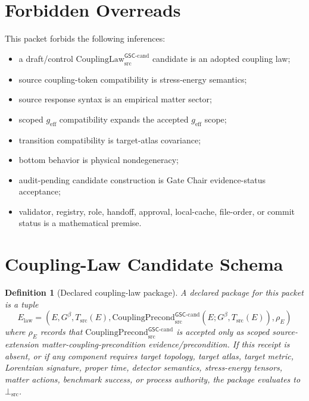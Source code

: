 \documentclass[11pt]{article}
\newcommand{\Gbeta}{G^\beta}
\newcommand{\geff}{g_{\mathrm{eff}}}
\newcommand{\CouplingPrecond}{\mathrm{CouplingPrecond}^{\mathsf{GSC}\mbox{-}\mathrm{cand}}_{\mathrm{src}}}
\newcommand{\CouplingLaw}{\mathrm{CouplingLaw}^{\mathsf{GSC}\mbox{-}\mathrm{cand}}_{\mathrm{src}}}
\newcommand{\BottomSrc}{\bot_{\mathrm{src}}}
\newtheorem{definition}{Definition}
\begin{document}
\section{Forbidden Overreads}

This packet forbids the following inferences:

\begin{itemize}[leftmargin=*]
  \item a draft/control \(\CouplingLaw\) candidate is an adopted coupling law;
  \item source coupling-token compatibility is stress-energy semantics;
  \item source response syntax is an empirical matter sector;
  \item scoped \(\geff\) compatibility expands the accepted \(\geff\) scope;
  \item transition compatibility is target-atlas covariance;
  \item bottom behavior is physical nondegeneracy;
  \item audit-pending candidate construction is Gate Chair evidence-status
  acceptance;
  \item validator, registry, role, handoff, approval, local-cache, file-order,
  or commit status is a mathematical premise.
\end{itemize}

\section{Coupling-Law Candidate Schema}

\begin{definition}[Declared coupling-law package]
A declared package for this packet is a tuple
\[
  E_{\mathrm{law}} =
  (E,\Gbeta,T_{\mathrm{src}}(E),\CouplingPrecond(E;\Gbeta,T_{\mathrm{src}}(E)),\rho_E)
\]
where \(\rho_E\) records that \(\CouplingPrecond\) is accepted only as scoped
source-extension matter-coupling-precondition evidence/precondition. If this
receipt is absent, or if any component requires target topology, target
atlas, target metric, Lorentzian signature, proper time, detector semantics,
stress-energy tensors, matter actions, benchmark success, or process
authority, the package evaluates to \(\BottomSrc\).
\end{definition}
\end{document}
